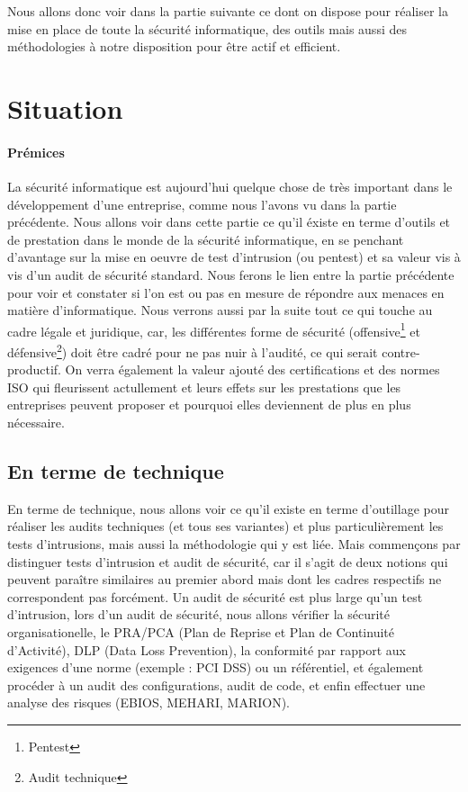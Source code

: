 \documentclass[a4paper]{memoir}
\begin{document}
Nous allons donc voir dans la partie suivante ce dont on dispose pour réaliser la mise en place de toute la sécurité informatique, des outils mais aussi des méthodologies à notre disposition pour être actif et efficient.

\part{Situation}

\subsection{Prémices}

La sécurité informatique est aujourd'hui quelque chose de très important dans le développement d'une entreprise, comme nous l'avons vu dans la partie précédente. Nous allons voir dans cette partie ce qu'il éxiste en terme d'outils et de prestation dans le monde de la sécurité informatique, en se penchant d'avantage sur la mise en oeuvre de test d'intrusion (ou pentest) et sa valeur vis à vis d'un audit de sécurité standard. Nous ferons le lien entre la partie précédente pour voir et constater si l'on est ou pas en mesure de répondre aux menaces en matière d'informatique. Nous verrons aussi par la suite tout ce qui touche au cadre légale et juridique, car, les différentes forme de sécurité (offensive\footnote{Pentest} et défensive\footnote{Audit technique}) doit être cadré pour ne pas nuir à l'audité, ce qui serait contre-productif. On verra également la valeur ajouté des certifications et des normes ISO qui fleurissent actullement et leurs effets sur les prestations que les entreprises peuvent proposer et pourquoi elles deviennent de plus en plus nécessaire. 

\chapter{En terme de technique}

En terme de technique, nous allons voir ce qu'il existe en terme d'outillage pour réaliser les audits techniques (et tous ses variantes) et plus particulièrement les tests d'intrusions, mais aussi la méthodologie qui y est liée. Mais commençons par distinguer tests d'intrusion et audit de sécurité, car il s'agit de deux notions qui peuvent paraître similaires au premier abord mais dont les cadres respectifs ne correspondent pas forcément.
Un audit de sécurité est plus large qu'un test d'intrusion, lors d'un audit de sécurité, nous allons vérifier la sécurité organisationelle, le PRA/PCA (Plan de Reprise et Plan de Continuité d'Activité), DLP (Data Loss Prevention), la conformité par rapport aux exigences d'une norme (exemple : PCI DSS) ou un référentiel, et également procéder à un audit des configurations, audit de code, et enfin effectuer une analyse des risques (EBIOS, MEHARI, MARION).
\end{document}
